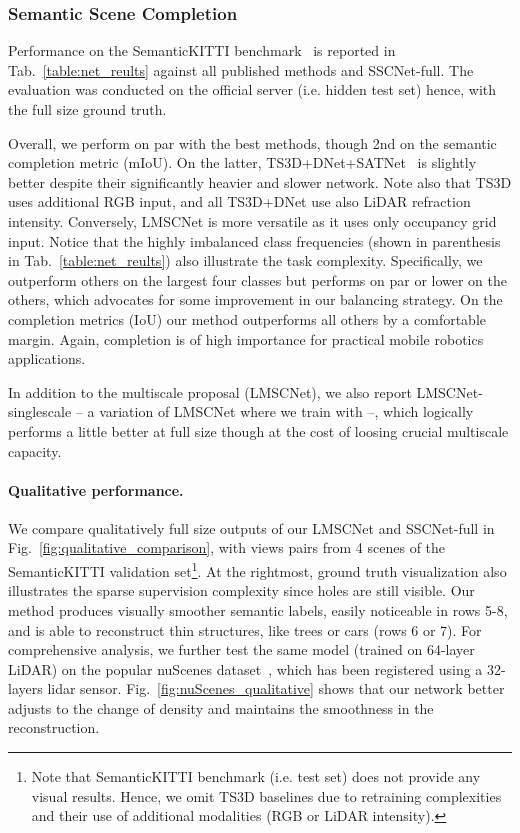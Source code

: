 \subsubsection{Semantic Scene Completion}\label{sec:exp-perf-ssc}

Performance on the SemanticKITTI benchmark~\cite{Behley2019SemanticKITTIAD} is reported in Tab.~\ref{table:net_reults} against all published methods and SSCNet-full. 
The evaluation was conducted on the official server (i.e. hidden test set) hence, with the full size ground truth.

Overall, we perform on par with the best methods, though 2nd on the semantic completion metric (mIoU). On the latter, TS3D+DNet+SATNet~\cite{Behley2019SemanticKITTIAD} is slightly better despite their significantly heavier and slower network. Note also that TS3D uses additional RGB input, and all TS3D+DNet use also LiDAR refraction intensity. Conversely, LMSCNet is more versatile as it uses only occupancy grid input.
Notice that the highly imbalanced class frequencies (shown in parenthesis in Tab.~\ref{table:net_reults}) also illustrate the task complexity. Specifically, we outperform others on the largest four classes but performs on par or lower on the others, which advocates for some improvement in our balancing strategy. 
On the completion metrics (IoU) our method outperforms all others by a comfortable margin. Again, completion is of high importance for practical mobile robotics applications. 

In addition to the multiscale proposal (LMSCNet), we also report LMSCNet-singlescale -- a variation of LMSCNet where we train with  --, which logically performs a little better at full size though at the cost of loosing crucial multiscale capacity.








\paragraph{Qualitative performance.}


We compare qualitatively full size outputs of our LMSCNet and SSCNet-full in Fig.~\ref{fig:qualitative_comparison}, with views pairs from 4 scenes of the SemanticKITTI validation set\footnote{Note that SemanticKITTI benchmark (i.e. test set) does not provide any visual results. Hence, we omit TS3D baselines due to retraining complexities and their use of additional modalities (RGB or LiDAR intensity).}. 
At the rightmost, ground truth visualization also illustrates the sparse supervision complexity since holes are still visible.
Our method produces visually smoother semantic labels, easily noticeable in rows 5-8, and is able to reconstruct thin structures, like trees or cars (rows 6 or 7). 
For comprehensive analysis, we further test the same model (trained on 64-layer LiDAR) on the popular nuScenes dataset~\cite{Caesar2019nuScenesAM}, which has been registered using a 32-layers lidar sensor. Fig.~\ref{fig:nuScenes_qualitative} shows that our network better adjusts to the change of density and maintains the smoothness in the reconstruction. \vspace{-0.3 cm}

